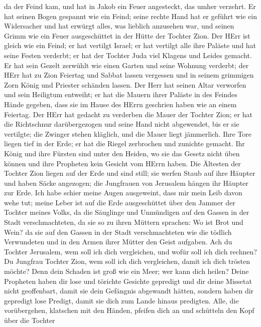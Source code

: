da der Feind kam, und hat in Jakob ein Feuer angesteckt, das umher
verzehrt.  Er hat seinen Bogen gespannt wie ein Feind; seine
rechte Hand hat er geführt wie ein Widersacher und hat erwürgt alles,
was lieblich anzusehen war, und seinen Grimm wie ein Feuer ausgeschüttet
in der Hütte der Tochter Zion.  Der HErr ist gleich wie ein
Feind; er hat vertilgt Israel; er hat vertilgt alle ihre Paläste und hat
seine Festen verderbt; er hat der Tochter Juda viel Klagens und Leides
gemacht.  Er hat sein Gezelt zerwühlt wie einen Garten und
seine Wohnung verderbt; der HErr hat zu Zion Feiertag und Sabbat lassen
vergessen und in seinem grimmigen Zorn König und Priester schänden
lassen.  Der Herr hat seinen Altar verworfen und sein
Heiligtum entweiht; er hat die Mauern ihrer Paläste in des Feindes Hände
gegeben, dass sie im Hause des HErrn geschrien haben wie an einem
Feiertag.  Der HErr hat gedacht zu verderben die Mauer der
Tochter Zion; er hat die Richtschnur darübergezogen und seine Hand nicht
abgewendet, bis er sie vertilgte; die Zwinger stehen kläglich, und die
Mauer liegt jämmerlich.  Ihre Tore liegen tief in der Erde;
er hat die Riegel zerbrochen und zunichte gemacht. Ihr König und ihre
Fürsten sind unter den Heiden, wo sie das Gesetz nicht üben können und
ihre Propheten kein Gesicht vom HErrn haben.  Die Ältesten
der Tochter Zion liegen auf der Erde und sind still; sie werfen Staub
auf ihre Häupter und haben Säcke angezogen; die Jungfrauen von Jerusalem
hängen ihr Häupter zur Erde.  Ich habe schier meine Augen
ausgeweint, dass mir mein Leib davon wehe tut; meine Leber ist auf die
Erde ausgeschüttet über den Jammer der Tochter meines Volks, da die
Säuglinge und Unmündigen auf den Gassen in der Stadt verschmachteten,
 da sie so zu ihren Müttern sprachen: Wo ist Brot und Wein?
da sie auf den Gassen in der Stadt verschmachteten wie die tödlich
Verwundeten und in den Armen ihrer Mütter den Geist aufgaben.
 Ach du Tochter Jerusalem, wem soll ich dich vergleichen,
und wofür soll ich dich rechnen? Du Jungfrau Tochter Zion, wem soll ich
dich vergleichen, damit ich dich trösten möchte? Denn dein Schaden ist
groß wie ein Meer; wer kann dich heilen?  Deine Propheten
haben dir lose und törichte Gesichte gepredigt und dir deine Missetat
nicht geoffenbart, damit sie dein Gefängnis abgewandt hätten, sondern
haben dir gepredigt lose Predigt, damit sie dich zum Lande hinaus
predigten.  Alle, die vorübergehen, klatschen mit den
Händen, pfeifen dich an und schütteln den Kopf über die Tochter
